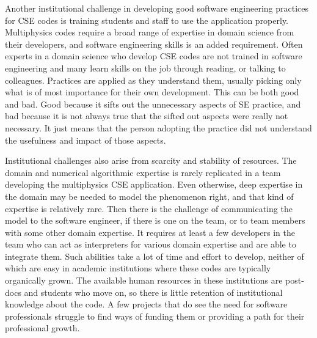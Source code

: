 Another institutional challenge in developing good software
engineering practices for CSE codes is training students and staff to
use the application properly. Multiphysics codes require a broad range
of expertise in domain science from their developers, and software
engineering skills is an added requirement.  Often experts in a domain
science who develop CSE codes are not trained in software engineering
and many learn skills on the job through reading, or talking to
colleagues. Practices are applied as they understand them, usually
picking only what is of most importance for their own development.
This can be both good and bad. Good because it sifts out the unnecessary aspects of SE
practice, and bad because it is not always true that the sifted out
aspects were really not necessary. It just means that the person
adopting the practice did not understand the usefulness and impact of
those aspects.


Institutional challenges also arise from scarcity and stability of
resources. The domain and numerical algorithmic
expertise is rarely replicated in a team developing the multiphysics
CSE application.  Even otherwise, deep expertise in the domain may be
needed to model the phenomenon right, and that kind of expertise is
relatively rare. Then there is the challenge of communicating the
model to the software engineer, if there is one on the team, or to
team members with some other domain expertise. It requires at least a
few developers in the team who can act as interpreters for various
domain expertise and are able to integrate them. Such abilities take a
lot of time and effort to develop, neither of which are
easy in academic institutions where these codes are typically
organically grown. The available human resources in these institutions
are post-docs and students who move on, so there is little retention of
institutional knowledge about the code.  A few projects that do see
the need for software professionals struggle to find ways of funding
them or providing a path for their professional growth. 

